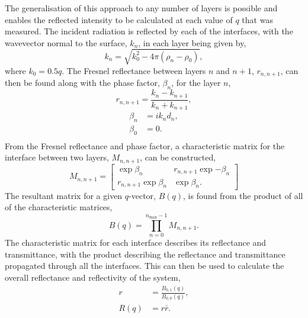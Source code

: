 \documentclass[
 reprint,
 superscriptaddress,
 amsmath,amssymb,
 aps,
]{revtex4-1}
\begin{document}
The generalisation of this approach to any number of layers is possible and enables the reflected intensity to be calculated at each value of $q$ that was measured. 
The incident radiation is reflected by each of the interfaces, with the wavevector normal to the surface, $k_n$, in each layer being given by, 
%
\begin{equation}
    k_n = \sqrt{k_0^2 - 4\pi(\rho_n - \rho_0)},
\end{equation}
%
where $k_0 = 0.5q$. 
The Fresnel reflectance between layers $n$ and $n+1$, $r_{n, n+1}$, can then be found along with the phase factor, $\beta_n$, for the layer $n$, 
%
\begin{equation}
    r_{n, n+1} = \frac{k_n - k_{n+1}}{k_n + k_{n+1}},
    \label{equ:fres}
\end{equation}
%
%
\begin{equation}
    \begin{aligned}
        \beta_n &= ik_nd_n, \\
        \beta_0 &= 0. \\
    \end{aligned}
\end{equation}
%
From the Fresnel reflectance and phase factor, a characteristic matrix for the interface between two layers, $M_{n, n+1}$, can be constructed, 
%
\begin{equation}
    M_{n, n+1} =
    \begin{bmatrix}
        \exp{\beta_n} & r_{n,n+1}\exp{-\beta_n} \\
        r_{n,n+1}\exp{\beta_n} & \exp{\beta_n}.
    \end{bmatrix}
\end{equation}
%
The resultant matrix for a given $q$-vector, $B(q)$, is found from the product of all of the characteristic matrices, 
%
\begin{equation}
    B(q) = \prod_{n=0}^{n_{\text{max}}-1}{M_{n, n+1}}.
\end{equation}
%
The characteristic matrix for each interface describes its reflectance and transmittance, with the product describing the reflectance and transmittance propagated through all the interfaces. 
This can then be used to calculate the overall reflectance and reflectivity of the system,
%
\begin{equation}
    \begin{aligned}
        r &=  \frac{B_{0,1}(q)}{B_{0,0}(q)}, \\
        R(q) &= r\bar r.
    \end{aligned}
\end{equation}
%
\end{document}
